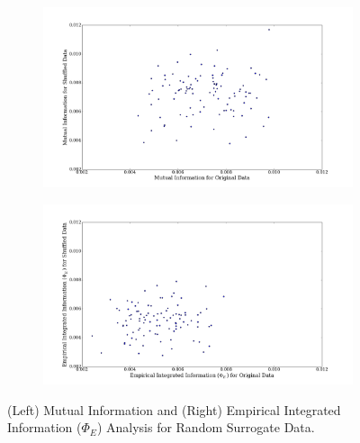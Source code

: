 \documentclass[a4paper,11pt]{article}
\begin{document}
\begin{figure}[H] 	
	\begin{minipage}[b]{0.5\linewidth}
		\begin{figure}[H]
		\begin{center}
		\includegraphics[scale = 0.2]{figures/synth_random_mi}
		\end{center}
		\end{figure}
		\vspace{2ex}
	\end{minipage}
	\begin{minipage}[b]{0.5\linewidth}
		\begin{figure}[H]
		\begin{center}
		\includegraphics[scale = 0.2]{figures/synth_random_phi}
		\end{center}
		\end{figure}
		\vspace{2ex}
	\end{minipage}
	\caption{
		 (Left) Mutual Information and (Right) Empirical Integrated Information ($\Phi_E$) Analysis for Random Surrogate Data.
		 \label{fig:synth_random} 
	}
\end{figure}
\end{document}
